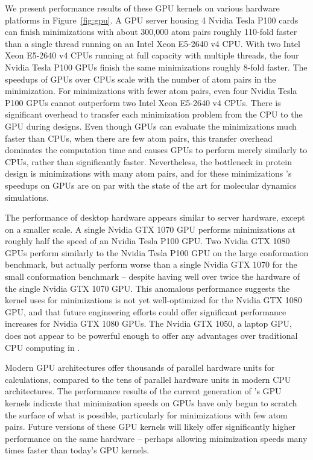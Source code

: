 We present performance results of these GPU kernels on various hardware platforms in Figure~\ref{fig:gpu}. A GPU server housing 4 Nvidia Tesla P100 cards can finish minimizations with about 300,000 atom pairs roughly 110-fold faster than a single thread running on an Intel Xeon E5-2640 v4 CPU. With two Intel Xeon E5-2640 v4 CPUs running at full capacity with multiple threads, the four Nvidia Tesla P100 GPUs finish the same minimizations roughly 8-fold faster. The speedups of GPUs over CPUs scale with the number of atom pairs in the minimization. For minimizations with fewer atom pairs, even four Nvidia Tesla P100 GPUs cannot outperform two Intel Xeon E5-2640 v4 CPUs. There is significant overhead to transfer each minimization problem from the CPU to the GPU during designs. Even though GPUs can evaluate the minimizations much faster than CPUs, when there are few atom pairs, this transfer overhead dominates the computation time and causes GPUs to perform merely similarly to CPUs, rather than significantly faster.  Nevertheless, the bottleneck in protein design is minimizations with many atom pairs, and for these minimizations \osprey's speedups on GPUs are on par with the state of the art for molecular dynamics simulations.  

The performance of desktop hardware appears similar to server hardware, except on a smaller scale. A single Nvidia GTX 1070 GPU performs minimizations at roughly half the speed of an Nvidia Tesla P100 GPU. Two Nvidia GTX 1080 GPUs perform similarly to the Nvidia Tesla P100 GPU on the large conformation benchmark, but actually perform worse than a single Nvidia GTX 1070 for the small conformation benchmark -- despite having well over twice the hardware of the single Nvidia GTX 1070 GPU. This anomalous performance suggests the kernel  uses for minimizations is not yet well-optimized for the Nvidia GTX 1080 GPU, and that future engineering efforts could offer significant performance increases for Nvidia GTX 1080 GPUs. The Nvidia GTX 1050, a laptop GPU, does not appear to be powerful enough to offer any advantages over traditional CPU computing in .

Modern GPU architectures offer thousands of parallel hardware units for calculations, compared to the tens of parallel hardware units in modern CPU architectures. The performance results of the current generation of \osprey's GPU kernels indicate that minimization speeds on GPUs have only begun to scratch the surface of what is possible, particularly for minimizations with few atom pairs. Future versions of these GPU kernels will likely offer significantly higher performance on the same hardware -- perhaps allowing minimization speeds many times faster than today's GPU kernels.

